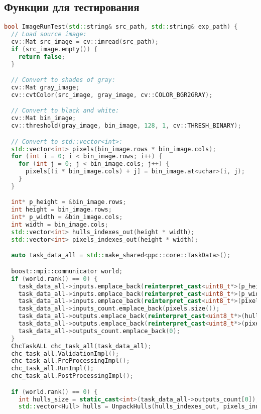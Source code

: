 \documentclass[12pt]{article}
\begin{document}
\newpage

\subsection{Функции для тестирования}
\label{appendix:image_run_test}
\begin{lstlisting}[language=C++, caption={Функция ImageRunTest() проверки корректности с помощью OpenCV}]
  bool ImageRunTest(std::string& src_path, std::string& exp_path) {
  // Load source image:
  cv::Mat src_image = cv::imread(src_path);
  if (src_image.empty()) {
    return false;
  }

  // Convert to shades of gray:
  cv::Mat gray_image;
  cv::cvtColor(src_image, gray_image, cv::COLOR_BGR2GRAY);

  // Convert to black and white:
  cv::Mat bin_image;
  cv::threshold(gray_image, bin_image, 128, 1, cv::THRESH_BINARY);

  // Convert to std::vector<int>:
  std::vector<int> pixels(bin_image.rows * bin_image.cols);
  for (int i = 0; i < bin_image.rows; i++) {
    for (int j = 0; j < bin_image.cols; j++) {
      pixels[(i * bin_image.cols) + j] = bin_image.at<uchar>(i, j);
    }
  }

  int* p_height = &bin_image.rows;
  int height = bin_image.rows;
  int* p_width = &bin_image.cols;
  int width = bin_image.cols;
  std::vector<int> hulls_indexes_out(height * width);
  std::vector<int> pixels_indexes_out(height * width);

  auto task_data_all = std::make_shared<ppc::core::TaskData>();

  boost::mpi::communicator world;
  if (world.rank() == 0) {
    task_data_all->inputs.emplace_back(reinterpret_cast<uint8_t*>(p_height));
    task_data_all->inputs.emplace_back(reinterpret_cast<uint8_t*>(p_width));
    task_data_all->inputs.emplace_back(reinterpret_cast<uint8_t*>(pixels.data()));
    task_data_all->inputs_count.emplace_back(pixels.size());
    task_data_all->outputs.emplace_back(reinterpret_cast<uint8_t*>(hulls_indexes_out.data()));
    task_data_all->outputs.emplace_back(reinterpret_cast<uint8_t*>(pixels_indexes_out.data()));
    task_data_all->outputs_count.emplace_back(0);
  }
  ChcTaskALL chc_task_all(task_data_all);
  chc_task_all.ValidationImpl();
  chc_task_all.PreProcessingImpl();
  chc_task_all.RunImpl();
  chc_task_all.PostProcessingImpl();

  if (world.rank() == 0) {
    int hulls_size = static_cast<int>(task_data_all->outputs_count[0]);
    std::vector<Hull> hulls = UnpackHulls(hulls_indexes_out, pixels_indexes_out, height, width, hulls_size);


\end{lstlisting}
\end{document}
